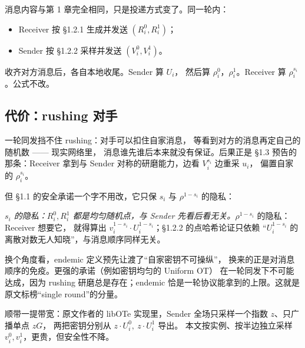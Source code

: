 消息内容与第 1 章完全相同，只是投递方式变了。同一轮内：

\begin{itemize}

\item
  Receiver 按 §1.2.1 生成并发送 $(R_i^0, R_i^1)$；
\item
  Sender 按 §1.2.2 采样并发送 $(V_i^0, V_i^1)$。
\end{itemize}

收齐对方消息后，各自本地收尾。Sender 算 $U_i$，
然后算 $\rho_i^0$，$\rho_i^1$。Receiver 算 $\rho_i^{s_i}$。公式不改。

\subsection{代价：rushing 对手}

一轮同发挡不住 rushing：对手可以扣住自家消息，
等看到对方的消息再定自己的随机数 ------ 现实网络里，
消息谁先谁后本来就没有保证。后果正是 §1.3 预告的那条：Receiver 拿到与
Sender 对称的研磨能力，边看 $V_i^{s_i}$ 边重采 $u_i$，
偏置自家的 $\rho_i^{s_i}$。

但 §1.1 的安全承诺一个字不用改，它只保 $s_i$ 与 $\rho^{1-s_i}$ 的隐私：

\emph{$s_i$ 的隐私：$R_i^0, R_i^1$ 都是均匀随机点，与 Sender
先看后看无关。}$\rho^{1-s_i}$ 的隐私：Receiver 想要它，
就得算出 $v_i^{1-s_i} \cdot U_i^{1-s_i}$；§1.2.2 的点哈希论证只依赖
“$U_i^{1-s_i}$ 的离散对数无人知晓”，与消息顺序同样无关。

换个角度看，endemic 定义预先让渡了“自家密钥不可操纵”，
换来的正是对消息顺序的免疫。更强的承诺（例如密钥均匀的 Uniform OT）
在一轮同发下不可能达成，因为 rushing 研磨总是存在；endemic
恰是一轮协议能拿到的上限。这就是原文标榜“single round”的分量。

顺带一提带宽：原文作者的 libOTe 实现里，Sender
全场只采样一个指数 $z$、只广播单点 $zG$，
两把密钥分别从 $z\cdot U_i^0,\ z\cdot U_i^1$ 导出。
本文按实例、按半边独立采样 $v_i^0, v_i^1$，更贵，但安全性不降。
